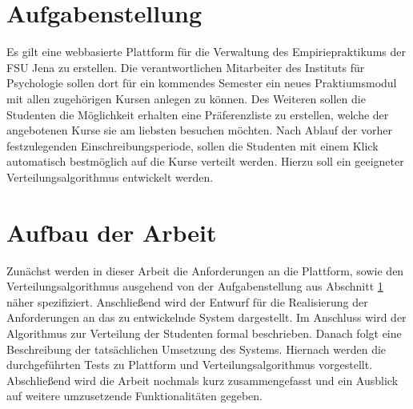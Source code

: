     \section{Aufgabenstellung}
    \label{sec:task}
        Es gilt eine webbasierte Plattform für die Verwaltung des Empiriepraktikums der FSU Jena zu erstellen.
		Die verantwortlichen Mitarbeiter des Instituts für Psychologie sollen dort für ein kommendes Semester ein neues Praktiumsmodul mit allen zugehörigen Kursen anlegen zu können.
        Des Weiteren sollen die Studenten die Möglichkeit erhalten eine Präferenzliste zu erstellen, welche der angebotenen Kurse sie am liebsten besuchen möchten.
        Nach Ablauf der vorher festzulegenden Einschreibungsperiode, sollen die Studenten mit einem Klick automatisch bestmöglich auf die Kurse verteilt werden.
        Hierzu soll ein geeigneter Verteilungsalgorithmus entwickelt werden.


    \section{Aufbau der Arbeit}
    \label{sec:structure}
       Zunächst werden in dieser Arbeit die Anforderungen an die Plattform, sowie den Verteilungsalgorithmus ausgehend von der Aufgabenstellung aus Abschnitt \ref{sec:task} näher spezifiziert.
       Anschließend wird der Entwurf für die Realisierung der Anforderungen an das zu entwickelnde System dargestellt.
       Im Anschluss wird der Algorithmus zur Verteilung der Studenten formal beschrieben.
       Danach folgt eine Beschreibung der tatsächlichen Umsetzung des Systems.
       Hiernach werden die durchgeführten Tests zu Plattform und Verteilungsalgorithmus vorgestellt.
       Abschließend wird die Arbeit nochmals kurz zusammengefasst und ein Ausblick auf weitere umzusetzende Funktionalitäten gegeben.
       